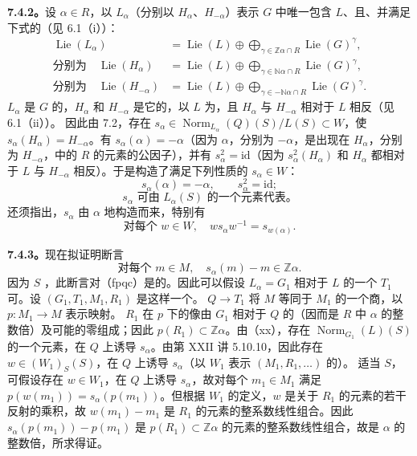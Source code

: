 \textbf{7.4.2。}设 $\alpha\in R$，以 $L_\alpha$（分别以 $H_\alpha$、$H_{-\alpha}$）表示 $G$ 中唯一包含 $L$、且、并满足下式的（见 6.1（i））：
\begin{align*}
 \operatorname{Lie}(L_\alpha)&=\operatorname{Lie}(L)\oplus\bigoplus_{\gamma\in\mathbb Z\alpha\cap R}\operatorname{Lie}(G)^\gamma,\\
 \text{分别为}\quad\operatorname{Lie}(H_\alpha)&=\operatorname{Lie}(L)\oplus\bigoplus_{\gamma\in\mathbb N\alpha\cap R}\operatorname{Lie}(G)^\gamma,\\
 \text{分别为}\quad\operatorname{Lie}(H_{-\alpha})&=\operatorname{Lie}(L)\oplus\bigoplus_{\gamma\in-\mathbb N\alpha\cap R}\operatorname{Lie}(G)^\gamma.
\end{align*}
$L_\alpha$ 是 $G$ 的，$H_\alpha$ 和 $H_{-\alpha}$ 是它的，以 $L$ 为，且 $H_\alpha$ 与 $H_{-\alpha}$ 相对于 $L$ 相反（见 6.1（ii））。
因此由 7.2，存在 $s_\alpha\in\operatorname{Norm}_{L_\alpha}(Q)(S)/L(S)\subset W$，使 $s_\alpha(H_\alpha)=H_{-\alpha}$。有 $s_\alpha(\alpha)=-\alpha$（因为 $\alpha$，分别为 $-\alpha$，是出现在 $H_\alpha$，分别为 $H_{-\alpha}$，中的 $R$ 的元素的公因子），并有 $s_\alpha^2=\mathrm{id}$（因为 $s_\alpha^2(H_\alpha)$ 和 $H_\alpha$ 都相对于 $L$ 与 $H_{-\alpha}$ 相反）。于是构造了满足下列性质的 $s_\alpha\in W$：
\[
 s_\alpha(\alpha)=-\alpha,\qquad s_\alpha^2=\mathrm{id};\tag{x}
\]
\[
 s_\alpha\text{ 可由 }L_\alpha(S)\text{ 的一个元素代表。}\tag{xx}
\]
还须指出，$s_\alpha$ 由 $\alpha$ 地构造而来，特别有
\[
 \text{对每个 }w\in W,\quad ws_\alpha w^{-1}=s_{w(\alpha)}.\tag{xxx}
\]

\textbf{7.4.3。}现在拟证明断言
\[
 \text{对每个 }m\in M,\quad s_\alpha(m)-m\in\mathbb Z\alpha.\tag{xxxx}
\]
因为 $S$ ，此断言对（fpqc）是的。因此可以假设 $L_\alpha=G_1$ 相对于 $L$ 的一个 $T_1$ 可。设 $(G_1,T_1,M_1,R_1)$ 是这样一个。 $Q\to T_1$ 将 $M$ 等同于 $M_1$ 的一个商，以 $p:M_1\to M$ 表示映射。
$R_1$ 在 $p$ 下的像由 $G_1$ 相对于 $Q$ 的（因而是 $R$ 中 $\alpha$ 的整数倍）及可能的零组成；因此 $p(R_1)\subset\mathbb Z\alpha$。由（xx），存在 $\operatorname{Norm}_{G_1}(L)(S)$ 的一个元素，在 $Q$ 上诱导 $s_\alpha$。由第 XXII 讲 5.10.10，因此存在 $w\in(W_1)_S(S)$，在 $Q$ 上诱导 $s_\alpha$（以 $W_1$ 表示 $(M_1,R_1,\ldots)$ 的）。
适当 $S$，可假设存在 $w\in W_1$，在 $Q$ 上诱导 $s_\alpha$，故对每个 $m_1\in M_1$ 满足 $p(w(m_1))=s_\alpha(p(m_1))$。但根据 $W_1$ 的定义，$w$ 是关于 $R_1$ 的元素的若干反射的乘积，故 $w(m_1)-m_1$ 是 $R_1$ 的元素的整系数线性组合。因此 $s_\alpha(p(m_1))-p(m_1)$ 是 $p(R_1)\subset\mathbb Z\alpha$ 的元素的整系数线性组合，故是 $\alpha$ 的整数倍，所求得证。

